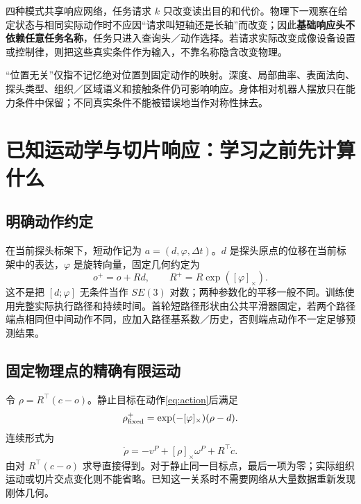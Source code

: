 \documentclass[UTF8,fontset=fandol,11pt,a4paper]{ctexart}
\theoremstyle{plain}
\theoremstyle{definition}
\theoremstyle{remark}
\numberwithin{equation}{section}
\begin{document}
四种模式共享响应网络，任务请求 $k$ 只改变读出目的和代价。物理下一观察在给定状态与相同实际动作时不应因“请求叫短轴还是长轴”而改变；因此\textbf{基础响应头不依赖任意任务名称}，任务只进入查询头／动作选择。若请求实际改变成像设备设置或控制律，则把这些真实条件作为输入，不靠名称隐含改变物理。

“位置无关”仅指不记忆绝对位置到固定动作的映射。深度、局部曲率、表面法向、探头类型、组织／区域语义和接触条件仍可影响响应。身体相对机器人摆放只在能力条件中保留；不同真实条件不能被错误地当作对称性抹去。

\section{已知运动学与切片响应：学习之前先计算什么}
\label{sec:analytic}
\subsection{明确动作约定}
在当前探头标架下，短动作记为 $a=(d,\varphi,\Delta t)$。$d$ 是探头原点的位移在当前标架中的表达，$\varphi$ 是旋转向量，固定几何约定为
\begin{equation}
o^+=o+Rd,\qquad R^+=R\exp([\varphi]_\times).
\label{eq:action}
\end{equation}
这不是把 $[d;\varphi]$ 无条件当作 $SE(3)$ 对数；两种参数化的平移一般不同。训练使用完整实际执行路径和持续时间。首轮短路径形状由公共平滑器固定，若两个路径端点相同但中间动作不同，应加入路径基系数／历史，否则端点动作不一定足够预测结果。

\subsection{固定物理点的精确有限运动}
令 $\rho=R^\top(c-o)$。静止目标在动作\eqref{eq:action}后满足
\begin{equation}
\rho^+_{\rm fixed}=\exp(-[\varphi]_\times)(\rho-d).
\label{eq:fixedexact}
\end{equation}
连续形式为
\begin{equation}
\boxed{\dot\rho=-v^P+[\rho]_\times\omega^P+R^\top\dot c.}
\label{eq:fixedvel}
\end{equation}
由对 $R^\top(c-o)$ 求导直接得到。对于静止同一目标点，最后一项为零；实际组织运动或切片交点变化则不能省略。已知这一关系时不需要网络从大量数据重新发现刚体几何。
\end{document}
